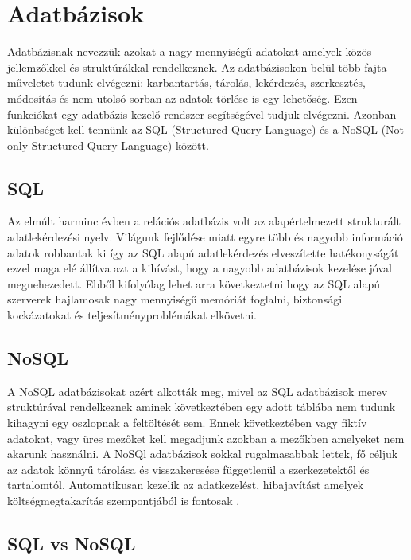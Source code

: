 \section{Adatbázisok}

Adatbázisnak nevezzük azokat a nagy mennyiségű adatokat amelyek közös jellemzőkkel és struktúrákkal rendelkeznek. Az adatbázisokon belül több fajta műveletet tudunk elvégezni: karbantartás, tárolás, lekérdezés, szerkesztés, módosítás és nem utolsó sorban az adatok törlése is egy lehetőség. Ezen funkciókat egy adatbázis kezelő rendszer segítségével tudjuk elvégezni.\cite{dbms} Azonban különbséget kell tennünk az SQL (Structured Query Language) és a NoSQL (Not only Structured Query Language) között.
\subsection{SQL}

Az elmúlt harminc évben a relációs adatbázis volt az alapértelmezett strukturált adatlekérdezési nyelv. Világunk fejlődése miatt egyre több és nagyobb információ adatok robbantak ki így az SQL alapú adatlekérdezés elveszítette hatékonyságát ezzel maga elé állítva azt a kihívást, hogy a nagyobb adatbázisok kezelése jóval megnehezedett. Ebből kifolyólag lehet arra következtetni hogy az SQL alapú szerverek hajlamosak nagy mennyiségű memóriát foglalni, biztonsági kockázatokat és teljesítményproblémákat elkövetni.\cite{venkatraman2016sql} 
	
\subsection{NoSQL}

A NoSQL adatbázisokat azért alkották meg, mivel az SQL adatbázisok merev struktúrával rendelkeznek aminek következtében egy adott táblába nem tudunk kihagyni egy oszlopnak a feltöltését sem. Ennek következtében vagy fiktív adatokat, vagy üres mezőket kell megadjunk azokban a mezőkben amelyeket nem akarunk használni. A NoSQl adatbázisok sokkal rugalmasabbak lettek, fő céljuk az adatok könnyű tárolása és visszakeresése függetlenül a szerkezetektől és tartalomtól. Automatikusan kezelik az adatkezelést, hibajavítást amelyek költségmegtakarítás szempontjából is fontosak \cite{venkatraman2016sql}.
	
\subsection{SQL vs NoSQL}

